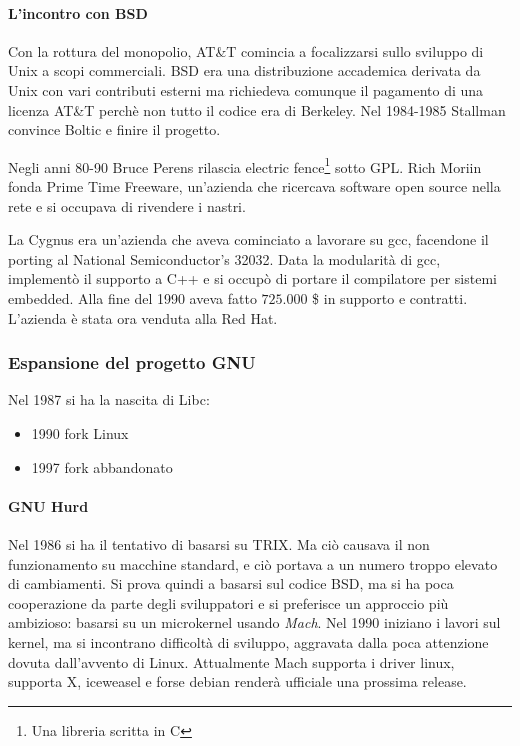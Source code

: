 \paragraph*{L'incontro con BSD} Con la rottura del monopolio, AT\&T comincia a focalizzarsi sullo sviluppo di Unix a scopi commerciali. BSD era una distribuzione accademica derivata da Unix con vari contributi esterni ma richiedeva comunque il pagamento di una licenza AT\&T perch\`e non tutto il codice era di Berkeley. Nel 1984-1985 Stallman convince Boltic e finire il progetto.

Negli anni 80-90 Bruce Perens rilascia electric fence\footnote{Una libreria scritta in C} sotto GPL. Rich Moriin fonda Prime Time Freeware, un'azienda che ricercava software open source nella rete e si occupava di rivendere i nastri.

La Cygnus era un'azienda che aveva cominciato a lavorare su gcc, facendone il porting al National Semiconductor's 32032. Data la modularit\`a di gcc, implement\`o il supporto a C++ e si occup\`o di portare il compilatore per sistemi embedded. Alla fine del 1990 aveva fatto $725.000$ \$ in supporto e contratti. L'azienda \`e stata ora venduta alla Red Hat.

\subsubsection{Espansione del progetto GNU}

Nel 1987 si ha la nascita di Libc:
\begin{itemize}

\item 1990 fork Linux
\item 1997 fork abbandonato

\end{itemize}

\paragraph*{GNU Hurd} Nel 1986 si ha il tentativo di basarsi su TRIX. Ma ci\`o causava il non funzionamento su macchine standard, e ci\`o portava a un numero troppo elevato di cambiamenti. Si prova quindi a basarsi sul codice BSD, ma si ha poca cooperazione da parte degli sviluppatori e si preferisce un approccio pi\`u ambizioso: basarsi su un microkernel usando \textit{Mach}. Nel 1990 iniziano i lavori sul kernel, ma si incontrano difficolt\`a di sviluppo, aggravata dalla poca attenzione dovuta dall'avvento di Linux. Attualmente Mach supporta i driver linux, supporta X, iceweasel e forse debian render\`a ufficiale una prossima release.

